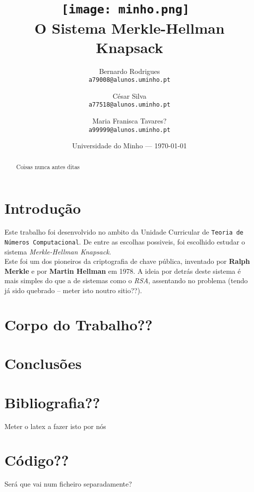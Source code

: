 \documentclass[11pt]{report}
\begin{document}
\title{\texttt{[image: minho.png]}~\\[1cm] O Sistema Merkle-Hellman Knapsack}

\author{Bernardo Rodrigues\\ \texttt{a79008@alunos.uminho.pt}\\ \and César Silva\\ \texttt{a77518@alunos.uminho.pt}\\ \and Maria Franisca Tavares?\\ \texttt{a99999@alunos.uminho.pt}\\}

\date{Universidade do Minho --- \today}

\maketitle

\tableofcontents

\begin{abstract}

	Coisas nunca antes ditas

\end{abstract}

\chapter{Introdução}

Este trabalho foi desenvolvido no ambito da Unidade Curricular de \texttt{Teoria de Números Computacional}. De entre as escolhas possiveis, foi escolhido estudar o sistema \textit{Merkle-Hellman Knapsack}. \\
Este foi um dos pioneiros da criptografia de chave pública, inventado por \textbf{Ralph Merkle} e por \textbf{Martin Hellman} em 1978.
A ideia por detrás deste sistema é mais simples do que a de sistemas como o \textit{RSA}, assentando no problema  (tendo já sido quebrado -- meter isto noutro sitio??).

\chapter{Corpo do Trabalho??}

\chapter{Conclusões}

\chapter{Bibliografia??}

Meter o latex a fazer isto por nós

\appendix

\chapter{Código??}

Será que vai num ficheiro separadamente?
\end{document}
